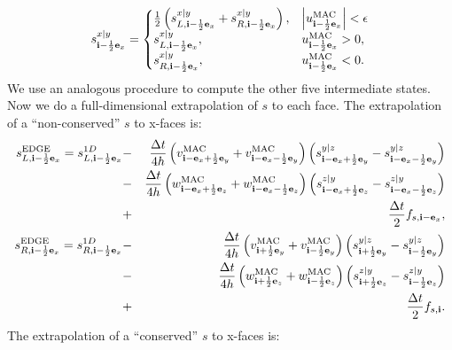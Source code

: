 \begin{equation}
s_{{\bf i}-\frac{1}{2}{\bf e}_x}^{x|y} =
\begin{cases}
\frac{1}{2}\left(s_{L,{\bf i}-\frac{1}{2}{\bf e}_x}^{x|y} + s_{R,{\bf i}-\frac{1}{2}{\bf e}_x}^{x|y}\right), & \left|u^{\rm MAC}_{{\bf i}-\frac{1}{2}{\bf e}_x}\right| < \epsilon \\
s_{L,{\bf i}-\frac{1}{2}{\bf e}_x}^{x|y}, & u^{\rm MAC}_{{\bf i}-\frac{1}{2}{\bf e}_x} > 0, \\
s_{R,{\bf i}-\frac{1}{2}{\bf e}_x}^{x|y}, & u^{\rm MAC}_{{\bf i}-\frac{1}{2}{\bf e}_x} < 0.
\end{cases}
\end{equation}
We use an analogous procedure to compute the other five intermediate
states.  Now we do a full-dimensional extrapolation of $s$ to each
face.  The extrapolation of a ``non-conserved'' $s$ to x-faces is:
\begin{eqnarray}
s_{L,{\bf i}-\frac{1}{2}{\bf e}_x}^{\rm EDGE} = s_{L,{\bf i}-\frac{1}{2}{\bf e}_x}^{1D} &-& \frac{\Delta t}{4h}\left(v_{{\bf i}-{\bf e}_x+\frac{1}{2}{\bf e}_y}^{\rm MAC}+v_{{\bf i}-{\bf e}_x-\frac{1}{2}{\bf e}_y}^{\rm MAC}\right)\left(s_{{\bf i}-{\bf e}_x+\frac{1}{2}{\bf e}_y}^{y|z}-s_{{\bf i}-{\bf e}_x-\frac{1}{2}{\bf e}_y}^{y|z}\right) \nonumber \\
&-& \frac{\Delta t}{4h}\left(w_{{\bf i}-{\bf e}_x+\frac{1}{2}{\bf e}_z}^{\rm MAC}+w_{{\bf i}-{\bf e}_x-\frac{1}{2}{\bf e}_z}^{\rm MAC}\right)\left(s_{{\bf i}-{\bf e}_x+\frac{1}{2}{\bf e}_z}^{z|y}-s_{{\bf i}-{\bf e}_x-\frac{1}{2}{\bf e}_z}^{z|y}\right) \nonumber \\
&+& \frac{\Delta t}{2}f_{s,{\bf i}-{\bf e}_x}, \\
s_{R,{\bf i}-\frac{1}{2}{\bf e}_x}^{\rm EDGE} = s_{R,{\bf i}-\frac{1}{2}{\bf e}_x}^{1D} &-& \frac{\Delta t}{4h}\left(v_{{\bf i}+\frac{1}{2}{\bf e}_y}^{\rm MAC}+v_{{\bf i}-\frac{1}{2}{\bf e}_y}^{\rm MAC}\right)\left(s_{{\bf i}+\frac{1}{2}{\bf e}_y}^{y|z}-s_{{\bf i}-\frac{1}{2}{\bf e}_y}^{y|z}\right) \nonumber \\
&-& \frac{\Delta t}{4h}\left(w_{{\bf i}+\frac{1}{2}{\bf e}_z}^{\rm MAC}+w_{{\bf i}-\frac{1}{2}{\bf e}_z}^{\rm MAC}\right)\left(s_{{\bf i}+\frac{1}{2}{\bf e}_z}^{z|y}-s_{{\bf i}-\frac{1}{2}{\bf e}_z}^{z|y}\right) \nonumber \\
&+& \frac{\Delta t}{2}f_{s,{\bf i}}.
\end{eqnarray}
The extrapolation of a ``conserved'' $s$ to x-faces is:
